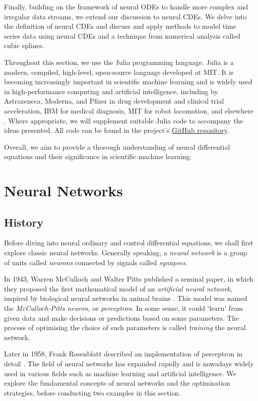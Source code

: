 \documentclass[a4paper,11pt,titlepage]{article}
\theoremstyle{definition}
\theoremstyle{plain}
\theoremstyle{remark}
\begin{document}
Finally, building on the framework of neural ODEs to handle more complex and irregular data streams, we extend our discussion to neural CDEs. We delve into the definition of neural CDEs and discuss and apply methods to model time series data using neural CDEs and a technique from numerical analysis called cubic splines.

Throughout this section, we use the Julia programming language. Julia is a modern, compiled, high-level, open-source language developed at MIT. It is becoming increasingly important in scientific machine learning and is widely used in high-performance computing and artificial intelligence, including by Astrazeneca, Moderna, and Pfizer in drug development and clinical trial acceleration, IBM for medical diagnosis, MIT for robot locomotion, and elsewhere \cite{SciMLSANUM2024}. Where appropriate, we will supplement suitable Julia code to accompany the ideas presented. All code can be found in the project's \href{https://github.com/jaamestaay/M2R-Group-29}{GitHub repository}.

Overall, we aim to provide a thorough understanding of neural differential equations and their significance in scientific machine learning. 

\pagebreak
\section{Neural Networks}
\label{sec:neuralnetworks}
\subsection{History}

Before diving into neural ordinary and control differential equations, we shall first explore classic neural networks. Generally speaking, a \textit{neural network} is a group of units called \textit{neurons} connected by signals called \textit{synapses}.

In 1943, Warren McCulloch and Walter Pitts published a seminal paper, in which they proposed the first mathematical model of an \textit{artificial neural network}, inspired by biological neural networks in animal brains \cite{McCulloch1943}. This model was named the \textit{McCulloch-Pitts neuron}, or \textit{perceptron}. In some sense, it could ‘learn’ from given data and make decisions or predictions based on some parameters. The process of optimising the choice of such parameters is called \textit{training} the neural network.

Later in 1958, Frank Rosenblatt described an implementation of perceptron in detail \cite{Rosenblatt1958}. The field of neural networks has expanded rapidly and is nowadays widely used in various fields such as machine learning and artificial intelligence. We explore the fundamental concepts of neural networks and the optimisation strategies, before conducting two examples in this section.
\end{document}
